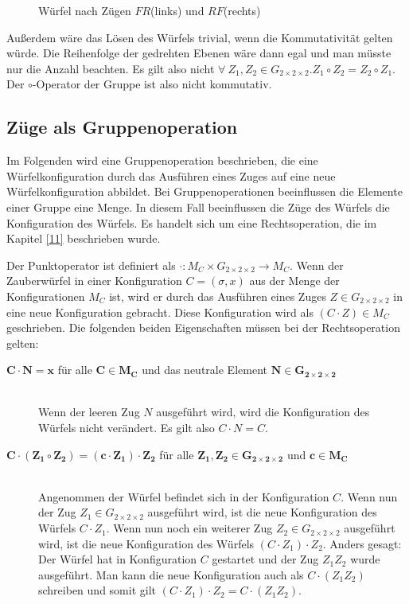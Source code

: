 \documentclass[12pt,a4paper, usenames, dvipsnames]{article}
\newcommand{\Gtwo}{\ensuremath{G_{2\times 2\times 2}}}
\begin{document}
\begin{figure}[h]
\caption[Würfel nach Zügen $FR$ (links) und $RF$ (rechts)]{Würfel nach Zügen $FR$(links) und $RF$(rechts)}
\label{12}
\end{figure}
Außerdem wäre das Lösen des Würfels trivial, wenn die Kommutativität gelten würde.\cite{TD} Die Reihenfolge der gedrehten Ebenen wäre dann egal und man müsste nur die Anzahl beachten. 
Es gilt also nicht $\forall \  Z_1, Z_2 \in \Gtwo. Z_1 \circ Z_2 = Z_2 \circ Z_1$. Der $\circ$-Operator der Gruppe ist also nicht kommutativ. 

%
%
%
%
%
%
%
%
%
%
%
%
%
%
%
%
%
%
%
%
\subsection*{Züge als Gruppenoperation}

Im Folgenden wird eine Gruppenoperation beschrieben, die eine Würfelkonfiguration durch das Ausführen eines Zuges auf eine neue Würfelkonfiguration abbildet. Bei Gruppenoperationen beeinflussen die Elemente einer Gruppe eine Menge. In diesem Fall beeinflussen die Züge des Würfels die Konfiguration des Würfels. Es handelt sich um eine Rechtsoperation, die im Kapitel \ref{11} beschrieben wurde.

Der Punktoperator ist definiert als $\cdot: M_C \times \Gtwo \rightarrow M_C$. Wenn der Zauberwürfel in einer Konfiguration $C=(\sigma, x)$ aus der Menge der Konfigurationen $M_C$ ist, wird er durch das Ausführen eines Zuges $Z \in \Gtwo$ in eine neue Konfiguration gebracht. Diese Konfiguration wird als $(C \cdot Z) \in M_C$ geschrieben.
Die folgenden beiden Eigenschaften müssen bei der Rechtsoperation gelten:

\begin{description}
\item [$\boldsymbol{C \cdot N = x}$ für alle $\boldsymbol{C \in M_C}$ und das neutrale Element $\boldsymbol{N \in \Gtwo}$] 
\ \\
Wenn der leeren Zug $N$ ausgeführt wird, wird die Konfiguration des Würfels nicht verändert. Es gilt also $C \cdot N = C$. 

\item [$\boldsymbol{C \cdot (Z_1 \circ Z_2) = (c \cdot Z_1) \cdot Z_2}$ für alle $\boldsymbol{Z_1, Z_2 \in \Gtwo}$ und $\boldsymbol{c \in M_C}$]
\ \\
Angenommen der Würfel befindet sich in der Konfiguration $C$. Wenn nun der Zug $Z_1 \in \Gtwo$ ausgeführt wird, ist die neue Konfiguration des Würfels $C \cdot Z_1$. Wenn nun noch ein weiterer Zug $Z_2 \in \Gtwo$ ausgeführt wird, ist die neue Konfiguration des Würfels $(C \cdot Z_1) \cdot Z_2$. 
Anders gesagt: Der Würfel hat in Konfiguration $C$ gestartet und der Zug $Z_1 Z_2$ wurde ausgeführt. Man kann die neue Konfiguration auch als $C \cdot (Z_1 Z_2)$ schreiben und somit gilt $(C \cdot Z_1) \cdot Z_2 = C \cdot (Z_1 Z_2)$. 
\end{description}
\end{document}
